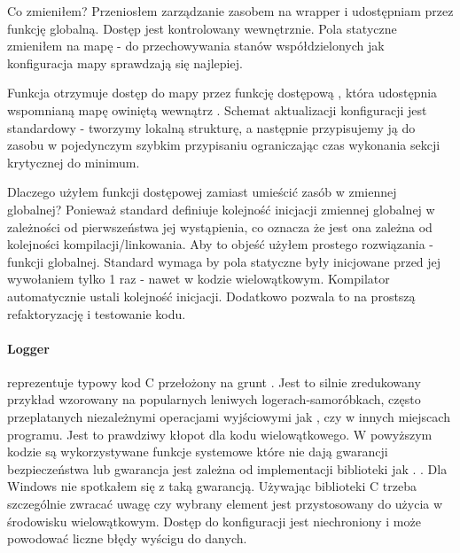 Co zmieniłem?
Przeniosłem zarządzanie zasobem na wrapper  i udostępniam przez funkcję globalną. Dostęp jest kontrolowany wewnętrznie. Pola statyczne zmieniłem na mapę - do przechowywania stanów współdzielonych jak konfiguracja mapy sprawdzają się najlepiej.

Funkcja  otrzymuje dostęp do mapy przez funkcję dostępową , która udostępnia wspomnianą mapę owiniętą wewnątrz . Schemat aktualizacji konfiguracji jest standardowy - tworzymy lokalną strukturę, a następnie przypisujemy ją do zasobu w pojedynczym szybkim przypisaniu ograniczając czas wykonania sekcji krytycznej do minimum.

Dlaczego użyłem funkcji dostępowej zamiast umieścić zasób w zmiennej globalnej?
Ponieważ standard definiuje kolejność inicjacji zmiennej globalnej w zależności od pierwszeństwa jej wystąpienia, co oznacza że jest ona zależna od kolejności kompilacji/linkowania. Aby to objeść użyłem prostego rozwiązania - funkcji globalnej. Standard wymaga by pola statyczne były inicjowane przed jej wywołaniem tylko 1 raz - nawet w kodzie wielowątkowym. Kompilator automatycznie ustali kolejność inicjacji. Dodatkowo pozwala to na prostszą refaktoryzację i testowanie kodu.

\paragraph{Logger}
 reprezentuje typowy kod C przełożony na grunt \Cpp{}. Jest to silnie zredukowany przykład wzorowany na popularnych leniwych logerach-samoróbkach, często przeplatanych niezależnymi operacjami wyjściowymi jak , czy  w innych miejscach programu. Jest to prawdziwy kłopot dla kodu wielowątkowego.
W powyższym kodzie są wykorzystywane funkcje systemowe które nie dają gwarancji bezpieczeństwa lub gwarancja jest zależna od implementacji biblioteki jak . . Dla Windows nie spotkałem się z taką gwarancją. Używając biblioteki C trzeba szczególnie zwracać uwagę czy wybrany element jest przystosowany do użycia w środowisku wielowątkowym. Dostęp do konfiguracji jest niechroniony i może powodować liczne błędy wyścigu do danych.

